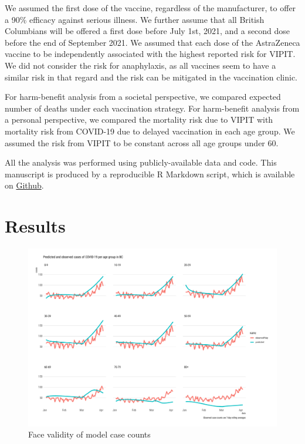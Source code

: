 \documentclass[]{interact}
\theoremstyle{plain}%
\theoremstyle{definition}
\theoremstyle{remark}
\begin{document}
We assumed the first dose of the vaccine, regardless of the
manufacturer, to offer a 90\% efficacy against serious illness. We
further assume that all British Columbians will be offered a first dose
before July 1st, 2021, and a second dose before the end of September
2021. We assumed that each dose of the AstraZeneca vaccine to be
independently associated with the highest reported risk for VIPIT. We
did not consider the risk for anaphylaxis, as all vaccines seem to have
a similar risk in that regard and the risk can be mitigated in the
vaccination clinic.

For harm-benefit analysis from a societal perspective, we compared
expected number of deaths under each vaccination strategy. For
harm-benefit analysis from a personal perspective, we compared the
mortality risk due to VIPIT with mortality risk from COVID-19 due to
delayed vaccination in each age group. We assumed the risk from VIPIT to
be constant across all age groups under 60.

All the analysis was performed using publicly-available data and code.
This manuscript is produced by a reproducible R Markdown script, which
is available on
\href{https://github.com/aminadibi/astrazenecaVIPIT}{Github}.

\hypertarget{results}{%
\section{Results}\label{results}}

\begin{figure}

{\centering \includegraphics[width=1\linewidth]{../figures/fig-validation} 

}

\caption{Face validity of model case counts}\label{fig:figValidation}
\end{figure}
\end{document}

